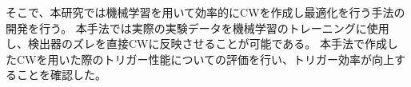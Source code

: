そこで、本研究では機械学習を用いて効率的にCWを作成し最適化を行う手法の開発を行う。
本手法では実際の実験データを機械学習のトレーニングに使用し、検出器のズレを直接CWに反映させることが可能である。
本手法で作成したCWを用いた際のトリガー性能についての評価を行い、トリガー効率が向上することを確認した。





